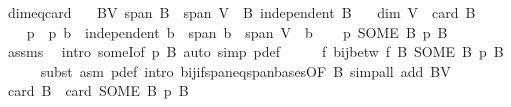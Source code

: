 \begin{isabellebody}
\isanewline
{}\isamarkupfalse%
\ dim{\isacharunderscore}{\kern0pt}eq{\isacharunderscore}{\kern0pt}card{\isacharcolon}{\kern0pt}\isanewline
\ \ \ BV{\isacharcolon}{\kern0pt}\ {\isachardoublequoteopen}span\ B\ {\isacharequal}{\kern0pt}\ span\ V{\isachardoublequoteclose}\ \ B{\isacharcolon}{\kern0pt}\ {\isachardoublequoteopen}independent\ B{\isachardoublequoteclose}\isanewline
\ \ \ {\isachardoublequoteopen}dim\ V\ {\isacharequal}{\kern0pt}\ card\ B{\isachardoublequoteclose}\isanewline
%
\isadelimproof
%
\endisadelimproof
%
\isatagproof
{}\isamarkupfalse%
\ {\isacharminus}{\kern0pt}\isanewline
\ \ \isamarkupfalse%
\ p\ \ {\isachardoublequoteopen}p\ b\ {\isasymequiv}\ independent\ b\ {\isasymand}\ span\ b\ {\isacharequal}{\kern0pt}\ span\ V{\isachardoublequoteclose}\ \ b\isanewline
\ \ \isamarkupfalse%
\ {\isachardoublequoteopen}p\ {\isacharparenleft}{\kern0pt}SOME\ B{\isachardot}{\kern0pt}\ p\ B{\isacharparenright}{\kern0pt}{\isachardoublequoteclose}\isanewline
\ \ \ \ \isamarkupfalse%
\ assms\ \isamarkupfalse%
\ {\isacharparenleft}{\kern0pt}intro\ someI{\isacharbrackleft}{\kern0pt}of\ p\ B{\isacharbrackright}{\kern0pt}{\isacharparenright}{\kern0pt}\ {\isacharparenleft}{\kern0pt}auto\ simp{\isacharcolon}{\kern0pt}\ p{\isacharunderscore}{\kern0pt}def{\isacharparenright}{\kern0pt}\isanewline
\ \ \isamarkupfalse%
\ \isamarkupfalse%
\ {\isachardoublequoteopen}{\isasymexists}f{\isachardot}{\kern0pt}\ bij{\isacharunderscore}{\kern0pt}betw\ f\ B\ {\isacharparenleft}{\kern0pt}SOME\ B{\isachardot}{\kern0pt}\ p\ B{\isacharparenright}{\kern0pt}{\isachardoublequoteclose}\isanewline
\ \ \ \ \isamarkupfalse%
\ {\isacharparenleft}{\kern0pt}subst\ {\isacharparenleft}{\kern0pt}asm{\isacharparenright}{\kern0pt}\ p{\isacharunderscore}{\kern0pt}def{\isacharcomma}{\kern0pt}\ intro\ bij{\isacharunderscore}{\kern0pt}if{\isacharunderscore}{\kern0pt}span{\isacharunderscore}{\kern0pt}eq{\isacharunderscore}{\kern0pt}span{\isacharunderscore}{\kern0pt}bases{\isacharbrackleft}{\kern0pt}OF\ B{\isacharbrackright}{\kern0pt}{\isacharparenright}{\kern0pt}\ {\isacharparenleft}{\kern0pt}simp{\isacharunderscore}{\kern0pt}all\ add{\isacharcolon}{\kern0pt}\ BV{\isacharparenright}{\kern0pt}\isanewline
\ \ \isamarkupfalse%
\ \isamarkupfalse%
\ {\isachardoublequoteopen}card\ B\ {\isacharequal}{\kern0pt}\ card\ {\isacharparenleft}{\kern0pt}SOME\ B{\isachardot}{\kern0pt}\ p\ B{\isacharparenright}{\kern0pt}{\isachardoublequoteclose}\isanewline

\end{isabellebody}
